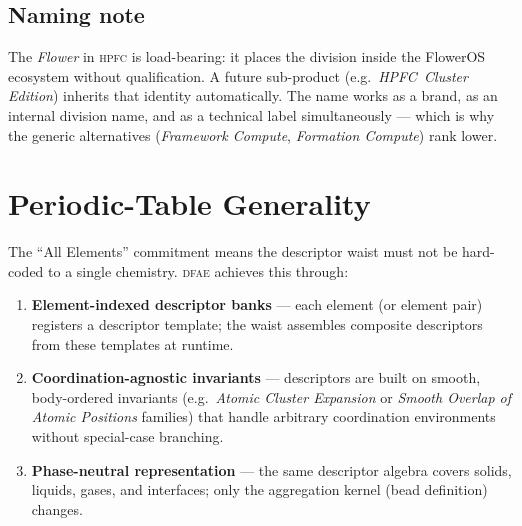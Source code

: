 \documentclass[11pt,a4paper]{article}
\theoremstyle{definition}
\theoremstyle{plain}
\newcommand{\DFAE}{\textsc{dfae}}
\newcommand{\HPFC}{\textsc{hpfc}}
\begin{document}
\subsection{Naming note}

The \emph{Flower} in \HPFC{} is load-bearing: it places the
division inside the FlowerOS ecosystem without qualification.
A future sub-product (e.g.\ \textit{HPFC~Cluster Edition}) inherits
that identity automatically.  The name works as a brand, as an
internal division name, and as a technical label simultaneously ---
which is why the generic alternatives (\emph{Framework Compute},
\emph{Formation Compute}) rank lower.


\section{Periodic-Table Generality}
\label{sec:elements}

The ``All Elements'' commitment means the descriptor waist must not
be hard-coded to a single chemistry.  \DFAE{} achieves this through:

\begin{enumerate}[label=\arabic*.]
  \item \textbf{Element-indexed descriptor banks} ---
        each element (or element pair) registers a descriptor
        template; the waist assembles composite descriptors from
        these templates at runtime.

  \item \textbf{Coordination-agnostic invariants} ---
        descriptors are built on smooth, body-ordered invariants
        (e.g.\ \emph{Atomic Cluster Expansion} or
        \emph{Smooth Overlap of Atomic Positions} families) that
        handle arbitrary coordination environments without
        special-case branching.

  \item \textbf{Phase-neutral representation} ---
        the same descriptor algebra covers solids, liquids, gases,
        and interfaces; only the aggregation kernel (bead definition)
        changes.
\end{enumerate}
\end{document}
